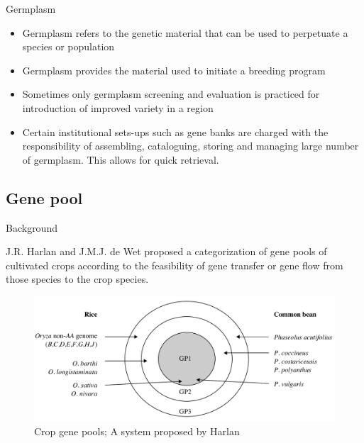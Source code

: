 \documentclass[ignorenonframetext,aspectratio=169]{beamer}
\providecommand{\tightlist}{%
  \setlength{\itemsep}{0pt}\setlength{\parskip}{0pt}}
\begin{document}
\begin{frame}{Germplasm}
\protect\hypertarget{germplasm}{}

\begin{itemize}
\tightlist
\item
  Germplasm refers to the genetic material that can be used to
  perpetuate a species or population
\item
  Germplasm provides the material used to initiate a breeding program
\item
  Sometimes only germplasm screening and evaluation is practiced for
  introduction of improved variety in a region
\item
  Certain institutional sets-ups such as gene banks are charged with the
  responsibility of assembling, cataloguing, storing and managing large
  number of germplasm. This allows for quick retrieval.
\end{itemize}

\end{frame}

\hypertarget{gene-pool}{%
\subsection{Gene pool}\label{gene-pool}}

\begin{frame}{Background}
\protect\hypertarget{background}{}

J.R. Harlan and J.M.J. de Wet proposed a categorization of gene pools of
cultivated crops according to the feasibility of gene transfer or gene
flow from those species to the crop species.

\begin{figure}
\includegraphics[width=0.45\linewidth]{./../images/crop_gene_pools} \caption{Crop gene pools; A system proposed by Harlan}\label{fig:gene-pools}
\end{figure}

\end{frame}
\end{document}
